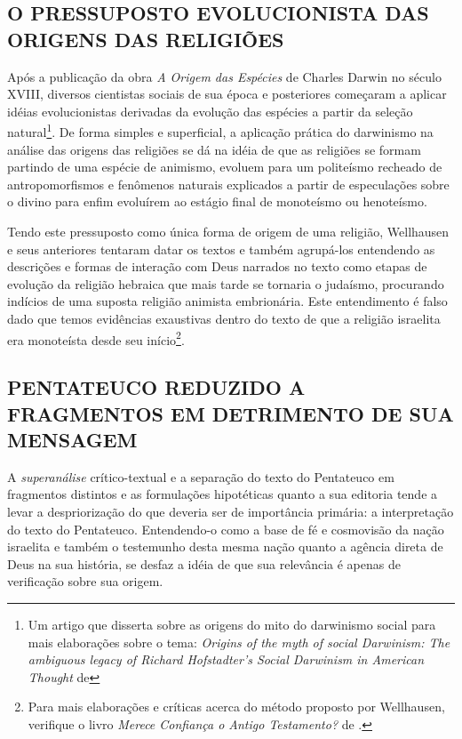 \documentclass[
    article,            %
	12pt,				%
	oneside,			%
	a4paper,			%
	english,			%
	french,				%
	spanish,			%
	brazil				%
	]{abntex2}
\begin{document}
\subsection{O PRESSUPOSTO EVOLUCIONISTA DAS ORIGENS DAS RELIGIÕES}
Após a publicação da obra \emph{A Origem das Espécies} de Charles Darwin no século XVIII, diversos cientistas sociais de sua época e posteriores começaram a aplicar idéias evolucionistas derivadas da evolução das espécies a partir da seleção natural\footnote{Um artigo que disserta sobre as origens do mito do darwinismo social para mais elaborações sobre o tema: \emph{Origins of the myth of social Darwinism: The ambiguous legacy of Richard Hofstadter's Social Darwinism in American Thought} de }. De forma simples e superficial, a aplicação prática do darwinismo na análise das origens das religiões se dá na idéia de que as religiões se formam partindo de uma espécie de animismo, evoluem para um politeísmo recheado de antropomorfismos e fenômenos naturais explicados a partir de especulações sobre o divino para enfim evoluírem ao estágio final de monoteísmo ou henoteísmo.

Tendo este pressuposto como única forma de origem de uma religião, Wellhausen e seus anteriores tentaram datar os textos e também agrupá-los entendendo as descrições e formas de interação com Deus narrados no texto como etapas de evolução da religião hebraica que mais tarde se tornaria o judaísmo, procurando indícios de uma suposta religião animista embrionária. Este entendimento é falso dado que temos evidências exaustivas dentro do texto de que a religião israelita era monoteísta desde seu início\footnote{Para mais elaborações e críticas acerca do método proposto por Wellhausen, verifique o livro \emph{Merece Confiança o Antigo Testamento?} de .}.

\subsection{PENTATEUCO REDUZIDO A FRAGMENTOS EM DETRIMENTO DE SUA MENSAGEM}
A \emph{superanálise} crítico-textual e a separação do texto do Pentateuco em fragmentos distintos e as formulações hipotéticas quanto a sua editoria tende a levar a despriorização do que deveria ser de importância primária: a interpretação do texto do Pentateuco. Entendendo-o como a base de fé e cosmovisão da nação israelita e também o testemunho desta mesma nação quanto a agência direta de Deus na sua história, se desfaz a idéia de que sua relevância é apenas de verificação sobre sua origem.
\end{document}

